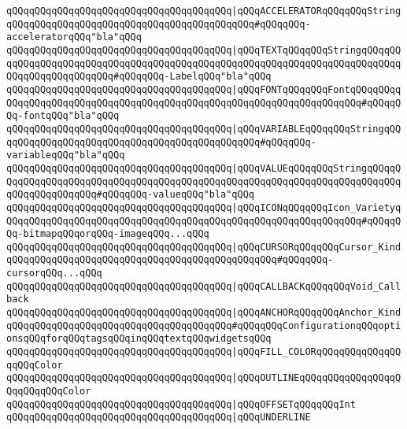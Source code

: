 \verb|qQQqqQQqqQQqqQQqqQQqqQQqqQQqqQQqqQQqqQQq|\verb#|qQQqACCELERATORqQQqqQQqStringqQQqqQQqqQQqqQQqqQQqqQQqqQQqqQQqqQQqqQQqqQQq#\verb|#qQQqqQQq-acceleratorqQQq"bla"qQQq|\newline
\verb|qQQqqQQqqQQqqQQqqQQqqQQqqQQqqQQqqQQqqQQq|\verb#|qQQqTEXTqQQqqQQqStringqQQqqQQqqQQqqQQqqQQqqQQqqQQqqQQqqQQqqQQqqQQqqQQqqQQqqQQqqQQqqQQqqQQqqQQqqQQqqQQqqQQqqQQqqQQqqQQq#\verb|#qQQqqQQq-LabelqQQq"bla"qQQq|\newline
\verb|qQQqqQQqqQQqqQQqqQQqqQQqqQQqqQQqqQQqqQQq|\verb#|qQQqFONTqQQqqQQqFontqQQqqQQqqQQqqQQqqQQqqQQqqQQqqQQqqQQqqQQqqQQqqQQqqQQqqQQqqQQqqQQqqQQqqQQq#\verb|#qQQqqQQq-fontqQQq"bla"qQQq|\newline
\verb|qQQqqQQqqQQqqQQqqQQqqQQqqQQqqQQqqQQqqQQq|\verb#|qQQqVARIABLEqQQqqQQqStringqQQqqQQqqQQqqQQqqQQqqQQqqQQqqQQqqQQqqQQqqQQqqQQq#\verb|#qQQqqQQq-variableqQQq"bla"qQQq|\newline
\verb|qQQqqQQqqQQqqQQqqQQqqQQqqQQqqQQqqQQqqQQq|\verb#|qQQqVALUEqQQqqQQqStringqQQqqQQqqQQqqQQqqQQqqQQqqQQqqQQqqQQqqQQqqQQqqQQqqQQqqQQqqQQqqQQqqQQqqQQqqQQqqQQqqQQqqQQqqQQq#\verb|#qQQqqQQq-valueqQQq"bla"qQQq|\newline
\verb|qQQqqQQqqQQqqQQqqQQqqQQqqQQqqQQqqQQqqQQq|\verb#|qQQqICONqQQqqQQqIcon_VarietyqQQqqQQqqQQqqQQqqQQqqQQqqQQqqQQqqQQqqQQqqQQqqQQqqQQqqQQqqQQqqQQq#\verb|#qQQqqQQq-bitmapqQQqorqQQq-imageqQQq...qQQq|\newline
\verb|qQQqqQQqqQQqqQQqqQQqqQQqqQQqqQQqqQQqqQQq|\verb#|qQQqCURSORqQQqqQQqCursor_KindqQQqqQQqqQQqqQQqqQQqqQQqqQQqqQQqqQQqqQQqqQQqqQQq#\verb|#qQQqqQQq-cursorqQQq...qQQq|\newline
\verb|qQQqqQQqqQQqqQQqqQQqqQQqqQQqqQQqqQQqqQQq|\verb#|qQQqCALLBACKqQQqqQQqVoid_Callback#\newline
\verb|qQQqqQQqqQQqqQQqqQQqqQQqqQQqqQQqqQQqqQQq|\verb#|qQQqANCHORqQQqqQQqAnchor_Kind#\newline
\verb|qQQqqQQqqQQqqQQqqQQqqQQqqQQqqQQqqQQqqQQq#qQQqqQQqConfigurationqQQqoptionsqQQqforqQQqtagsqQQqinqQQqtextqQQqwidgetsqQQq|\newline
\verb|qQQqqQQqqQQqqQQqqQQqqQQqqQQqqQQqqQQqqQQq|\verb#|qQQqFILL_COLORqQQqqQQqqQQqqQQqqQQqColor#\newline
\verb|qQQqqQQqqQQqqQQqqQQqqQQqqQQqqQQqqQQqqQQq|\verb#|qQQqOUTLINEqQQqqQQqqQQqqQQqqQQqqQQqqQQqColor#\newline
\verb|qQQqqQQqqQQqqQQqqQQqqQQqqQQqqQQqqQQqqQQq|\verb#|qQQqOFFSETqQQqqQQqInt#\newline
\verb|qQQqqQQqqQQqqQQqqQQqqQQqqQQqqQQqqQQqqQQq|\verb#|qQQqUNDERLINE#\newline
